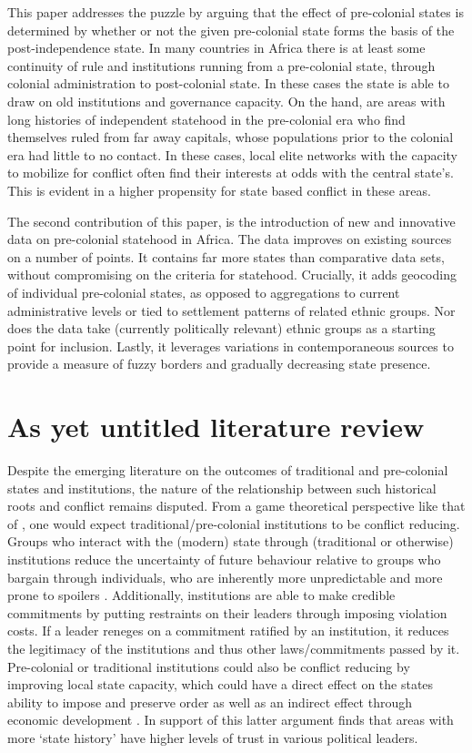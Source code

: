 \documentclass[12pt]{article}
\begin{document}
This paper addresses the puzzle by arguing that the effect of pre-colonial
states is determined by whether or not the given pre-colonial state forms the
basis of the post-independence state. In many countries in Africa there is at
least some continuity of rule and institutions running from a pre-colonial
state, through colonial administration to post-colonial state. In these cases
the state is able to draw on old institutions and governance capacity. On the
hand, are areas with long histories of independent statehood in the pre-colonial
era who find themselves ruled from far away capitals, whose populations prior to
the colonial era had little to no contact. In these cases, local elite networks
with the capacity to mobilize for conflict often find their interests at odds
with the central state's. This is evident in a higher propensity for state based
conflict in these areas.

The second contribution of this paper, is the introduction of new and innovative
data on pre-colonial statehood in Africa. The data improves on existing sources on
a number of points. It contains far more states than comparative data sets,
without compromising on the criteria for statehood. Crucially, it adds geocoding
of individual pre-colonial states, as opposed to aggregations to current
administrative levels or tied to settlement patterns of related ethnic groups.
Nor does the data take (currently politically relevant) ethnic groups as
a starting point for inclusion. %
Lastly, it leverages variations in contemporaneous sources to provide a measure
of fuzzy borders and gradually decreasing state presence.

\section{As yet untitled literature review} 

Despite the emerging literature on the outcomes of traditional and pre-colonial
states and institutions, the nature of the relationship between such historical
roots and conflict remains disputed. From a game theoretical perspective like
that of \citet{Fearon1995}, one would expect traditional/pre-colonial
institutions to be conflict reducing. Groups who interact with the (modern)
state through (traditional or otherwise) institutions reduce the uncertainty of
future behaviour relative to groups who bargain through individuals, who are
inherently more unpredictable and more prone to spoilers \citep{Wig2016}.
Additionally, institutions are able to make credible commitments by putting
restraints on their leaders through imposing violation costs. If a leader
reneges on a commitment ratified by an institution, it reduces the legitimacy of
the institutions and thus other laws/commitments passed by it. Pre-colonial or
traditional institutions could also be conflict reducing by improving local
state capacity, which could have a direct effect on the states ability to impose
and preserve order as well as an indirect effect through economic development
\citep{Depetris-Chauvin2016}. In support of this latter argument
\citet{Depetris-Chauvin2016} finds that areas with more `state history' have
higher levels of trust in various political leaders.
\end{document}
